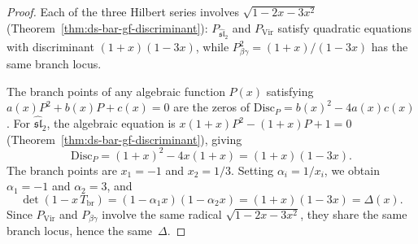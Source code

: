 \begin{proof}
Each of the three Hilbert series involves $\sqrt{1 - 2x - 3x^2}$
(Theorem~\ref{thm:ds-bar-gf-discriminant}):
$P_{\widehat{\mathfrak{sl}}_2}$ and $P_{\mathrm{Vir}}$ satisfy
quadratic equations with discriminant $(1+x)(1-3x)$, while
$P_{\beta\gamma}^2 = (1+x)/(1-3x)$ has the same branch locus.

The branch points of any algebraic function $P(x)$ satisfying
$a(x)P^2 + b(x)P + c(x) = 0$ are the zeros of
$\mathrm{Disc}_P = b(x)^2 - 4a(x)c(x)$.  For
$\widehat{\mathfrak{sl}}_2$, the algebraic equation is
$x(1+x)P^2 - (1+x)P + 1 = 0$
(Theorem~\ref{thm:ds-bar-gf-discriminant}), giving
\[
\mathrm{Disc}_P = (1+x)^2 - 4x(1+x) = (1+x)(1-3x).
\]
The branch points are $x_1 = -1$ and $x_2 = 1/3$.
Setting $\alpha_i = 1/x_i$, we obtain $\alpha_1 = -1$ and
$\alpha_2 = 3$, and
\[
\det(1 - x\,T_{\mathrm{br}}) = (1 - \alpha_1 x)(1 - \alpha_2 x)
= (1+x)(1-3x) = \Delta(x).
\]
Since $P_{\mathrm{Vir}}$ and $P_{\beta\gamma}$ involve the same
radical $\sqrt{1-2x-3x^2}$, they share the same branch locus,
hence the same~$\Delta$.
\end{proof}

